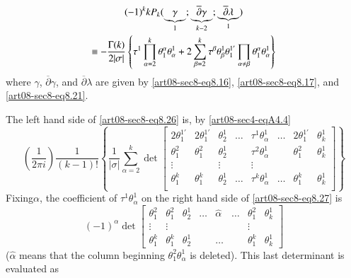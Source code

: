 \begin{gather}
(-1)^{k}kP_{k}(\underbrace{\gamma}_{1}; \underbrace{\overline{\partial}\gamma}_{k-2}; \underbrace{\overline{\partial}\lambda}_{1})\notag\\
\equiv - \dfrac{\Gamma(k)}{2|\sigma|}\left\{\tau^{1}\prod\limits^{k}_{\alpha=2}\theta^{\alpha}_{1}\theta^{1}_{\alpha}+2\sum\limits^{k}_{\beta=2}\tau^{\beta}\theta^{1}_{\beta}\theta^{1'}_{1}\prod\limits_{\alpha\neq \beta}\theta^{\alpha}_{1}\theta^{1}_{\alpha}\right\}\label{art08-sec8-eq8.26}
\end{gather}
where $\gamma$, $\overline{\partial}\gamma$, and $\overline{\partial}\lambda$ are given by \eqref{art08-sec8-eq8.16}, \eqref{art08-sec8-eq8.17}, and \eqref{art08-sec8-eq8.21}.

The left hand side of \eqref{art08-sec8-eq8.26} is, by \eqref{art08-sec4-eqA4.4}
{{\fontsize{9pt}{11pt}\selectfont
\begin{equation}
\left(\dfrac{1}{2\pi i}\right)\dfrac{1}{(k-1)!}\left\{\dfrac{1}{|\sigma|}\sum\limits^{k}_{\alpha=2}\det 
\begin{bmatrix}
2\theta^{1'}_{1} & 2\theta^{1'}_{1} & \theta^{1}_{2} & \ldots & \tau^{1}\theta^{1}_{\alpha} & \ldots & 2\theta^{1'}_{1} & \theta^{1}_{k}\\
\theta^{2}_{1} & \theta^{2}_{1} & \theta^{1}_{2} &  & \tau^{2}\theta^{1}_{\alpha} & & \theta^{2}_{1} & \theta^{1}_{k}\\
\vdots & & \vdots & & \vdots & & &\\
\theta^{k}_{1} & \theta^{k}_{1} & \theta^{1}_{2} & \ldots & \tau^{k}\theta^{1}_{\alpha} & \ldots & \theta^{k}_{1} & \theta^{1}_{k}\\
\end{bmatrix}\right\}\label{art08-sec8-eq8.27}
\end{equation}}\relax}
Fixing\pageoriginale $\alpha$, the coefficient of $\tau^{1}\theta^{1}_{\alpha}$ on the right hand side of \eqref{art08-sec8-eq8.27} is
$$
(-1)^{\alpha}\det
\begin{bmatrix}
\theta^{2}_{1} & \theta^{2}_{1} & \theta^{1}_{2} & \ldots & \widehat{\alpha} & \ldots & \theta^{2}_{1} & \theta^{1}_{k}\\
\vdots & \vdots & & & & & \vdots & \\
\theta^{k}_{1} & \theta^{k}_{1} & \theta^{1}_{2} & & \ldots & & \theta^{k}_{1} & \theta^{1}_{k}
\end{bmatrix}
$$
($\widehat{\alpha}$ means that the column beginning $\theta^{2}_{1}\theta^{1}_{\alpha}$ is deleted). This last determinant is evaluated as
